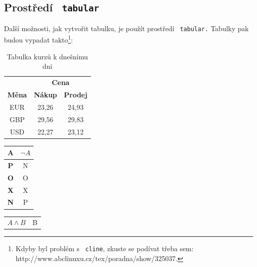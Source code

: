 \documentclass[a4paper,11pt]{article}
\begin{document}
\subsection{Prostředí \texttt{ tabular }}
    Další možnosti, jak vytvořit tabulku, je použít prostředí \texttt{ tabular.} Tabulky pak budou vypadat takto\footnote{Kdyby byl problém s \texttt{ cline}, zkuste se podívat třeba sem: http://www.abclinuxu.cz/tex/poradna/show/325037.}:
    \begin{center}
        \begin{table}[h!]
            \centering
            \begin{tabular}{ |c|c|c| } 
            \hline
            & \multicolumn{2}{|c|}{\textbf{Cena}} \\ 
            \cline{2-3}
            \textbf{Měna} & \textbf{Nákup} & \textbf{Prodej} \\
            \hline
            EUR & 23,26 & 24,93 \\ 
            GBP & 29,56 & 29,83 \\ 
            USD & 22,27 & 23,12 \\ 
            \hline
            \end{tabular}
            \caption{Tabulka kurzů k dnešnímu dni}
            \label{tab:kurzy}
        \end{table}
        \begin{table}[ht]
            \centering
            \begin{varwidth}[t]{\linewidth}
                \centering
                \begin{tabular}{|c|c|}
                \hline
                A & $\lnot A$ \\ 
                \hline
                \textbf{P} & N \\ 
                \hline
                \textbf{O} & O \\ 
                \hline
                \textbf{X} & X \\ 
                \hline
                \textbf{N} & P \\ 
                \hline
                \end{tabular}
            \end{varwidth}
            \begin{varwidth}[t]{\linewidth}
                \centering
                \begin{tabular}{|c|c|c|c|c|c|}
                    \hline
                    \multicolumn{2}{|c|}{\multirow{2}{*}{$A \land B$}} & \multicolumn{4}{c|}{B} \\ 

\end{tabular}
\end{varwidth}
\end{table}
\end{center}
\end{document}
